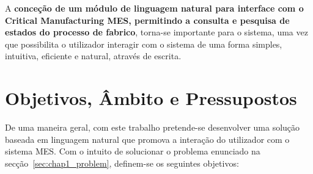 A \textbf{conceção de um módulo de linguagem natural para interface com o Critical Manufacturing \gls{MES}, permitindo a consulta e pesquisa de estados do processo de fabrico}, torna-se importante para o sistema, uma vez que possibilita o utilizador interagir com o sistema de uma forma simples, intuitiva, eficiente e natural, através de escrita.

\section{Objetivos, Âmbito e Pressupostos}
\label{sec:chap1_objectives}
De uma maneira geral, com este trabalho pretende-se desenvolver uma solução baseada em linguagem natural que promova a interação do utilizador com o sistema \gls{MES}. Com o intuito de solucionar o problema enunciado na secção~\ref{sec:chap1_problem}, definem-se os seguintes objetivos:

